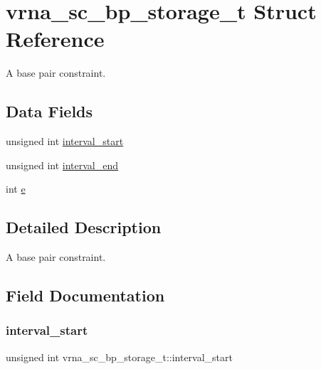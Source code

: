 \hypertarget{structvrna__sc__bp__storage__t}{}\section{vrna\+\_\+sc\+\_\+bp\+\_\+storage\+\_\+t Struct Reference}
\label{structvrna__sc__bp__storage__t}


A base pair constraint.  


\subsection*{Data Fields}
\begin{DoxyCompactItemize}
\item 
unsigned int \mbox{\hyperlink{structvrna__sc__bp__storage__t_aa7302ae3a59e3d353bc20ed719299bd3}{interval\+\_\+start}}
\item 
unsigned int \mbox{\hyperlink{structvrna__sc__bp__storage__t_a3c11eb4cb19163fa3fdbfda674efad91}{interval\+\_\+end}}
\item 
int \mbox{\hyperlink{structvrna__sc__bp__storage__t_a377405c7607c69c7f58baab0b06092eb}{e}}
\end{DoxyCompactItemize}


\subsection{Detailed Description}
A base pair constraint. 

\subsection{Field Documentation}
\mbox{\label{structvrna__sc__bp__storage__t_aa7302ae3a59e3d353bc20ed719299bd3}} 
\subsubsection{\texorpdfstring{interval\+\_\+start}{interval\_start}}
{\footnotesize\ttfamily unsigned int vrna\+\_\+sc\+\_\+bp\+\_\+storage\+\_\+t\+::interval\+\_\+start}

\mbox{\label{structvrna__sc__bp__storage__t_a3c11eb4cb19163fa3fdbfda674efad91}} 

